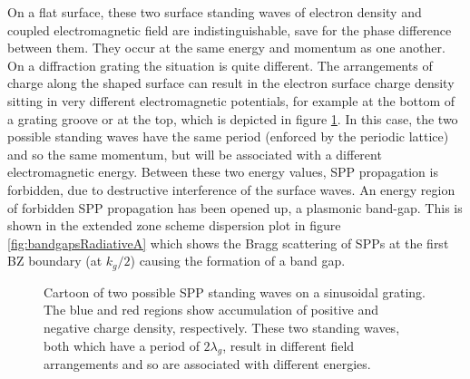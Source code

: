 On a flat surface, these two surface standing waves of electron density and coupled electromagnetic field are indistinguishable, save for the phase difference between them. They occur at the same energy and momentum as one another. On a diffraction grating the situation is quite different. The arrangements of charge along the shaped surface can result in the electron surface charge density sitting in very different electromagnetic potentials, for example at the bottom of a grating groove or at the top, which is depicted in figure \ref{fig:bandgapsCartoon}. In this case, the two possible standing waves have the same period (enforced by the periodic lattice) and so the same momentum, but will be associated with a different electromagnetic energy. Between these two energy values, SPP propagation is forbidden, due to destructive interference of the surface waves. An energy region of forbidden SPP propagation has been opened up, a plasmonic band-gap.  This is shown in the extended zone scheme dispersion plot in figure \ref{fig:bandgapsRadiativeA} which shows the Bragg scattering of SPPs at the first BZ boundary (at $k_g/2$) causing the formation of a band gap.

\begin{figure}
\begin{center}
\end{center}
\caption[Cartoon of two possible SPP standing waves on a sinusoidal grating.]{Cartoon of two possible SPP standing waves on a sinusoidal grating. The blue and red regions show accumulation of positive and negative charge density, respectively. These two standing waves, both which have a period of $2\lambda_g$, result in different field arrangements and so are associated with different energies.\label{fig:bandgapsCartoon}}
\end{figure}

